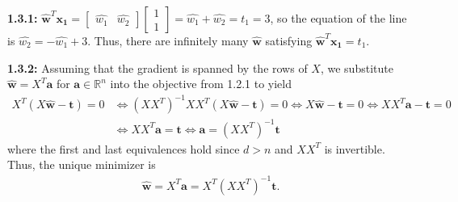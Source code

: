 \documentclass[12pt]{article}
\newcommand{\m}[1]{\mathbf{#1}}
\newcommand{\mhat}[1]{\hat{\mathbf{#1}}}
\begin{document}
\textbf{1.3.1:} $\mhat{w}^T\m{x_1} = \begin{bmatrix}\hat{w_1} & \hat{w_2}\end{bmatrix}\begin{bmatrix}1 \\ 1\end{bmatrix} = \hat{w_1} + \hat{w_2} = t_1 = 3$, so the equation of the line is $\hat{w_2} = -\hat{w_1} + 3$. Thus, there are infinitely many $\mhat{w}$ satisfying $\mhat{w}^T\m{x_1} = t_1$.

\textbf{1.3.2:} Assuming that the gradient is spanned by the rows of $X$, we substitute $\mhat w = X^T\m{a}$ for $\m a \in \mathbb{R}^n$ into the objective from 1.2.1 to yield
\begin{align*}
     X^T(X\mhat w - \m t) = 0 &\iff (XX^T)^{-1}XX^T(X\mhat w - \m t) = 0 \iff X\mhat w -\m t = 0 \iff XX^T\m a -\m t = 0\\
     &\iff XX^T\m a = \m t \iff \m a = (XX^T)^{-1}\m t
\end{align*} where the first and last equivalences hold since $d > n$ and $XX^T$ is invertible. Thus, the unique minimizer is
\begin{align*}
    \mhat w = X^T\m a = X^T(XX^T)^{-1}\m t.
\end{align*}
\end{document}
